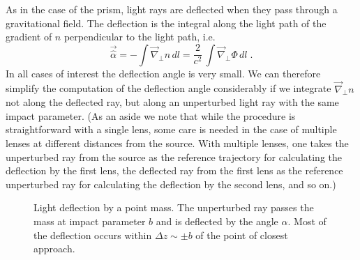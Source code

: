 \documentclass[a4paper,10pt]{article} %
\begin{document}
As in the case of the prism, light rays are deflected when they pass
through a gravitational field. The deflection is the integral along
the light path of the gradient of $n$ perpendicular to the light path,
i.e.
\begin{equation}
  \vec{\hat\alpha} = -\int\vec\nabla_\perp n\,dl
  = \frac{2}{c^2}\,\int\vec\nabla_\perp\Phi\,dl\;.
\label{eq:2.5}
\end{equation}
In all cases of interest the deflection angle is very small. We can
therefore simplify the computation of the deflection angle
considerably if we integrate $\vec\nabla_\perp n$ not along the
deflected ray, but along an unperturbed light ray with the same impact
parameter. (As an aside we note that while the procedure is
straightforward with a single lens, some care is needed in the case of
multiple lenses at different distances from the source. With multiple
lenses, one takes the unperturbed ray from the source as the reference
trajectory for calculating the deflection by the first lens, the
deflected ray from the first lens as the reference unperturbed ray for
calculating the deflection by the second lens, and so on.)

\begin{figure}[ht] %
\begin{center}
\begin{minipage}[t]{0.6\hsize}
\end{minipage}
\end{center}
\caption{Light deflection by a point mass. The unperturbed ray passes
  the mass at impact parameter $b$ and is deflected by the angle
  $\hat\alpha$. Most of the deflection occurs within $\Delta z\sim\pm
  b$ of the point of closest approach.}
\label{NB:fig2.2}
\end{figure}
\end{document}
